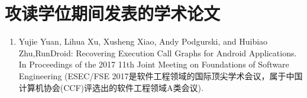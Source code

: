 \chapter*{攻读学位期间发表的学术论文}



\begin{enumerate}
	
	\item Yujie Yuan, Lihua Xu, Xusheng Xiao, Andy Podgurski, and Huibiao Zhu,RunDroid: Recovering Execution Call Graphs for Android Applications. In Proceedings of the 2017 11th Joint Meeting on Foundations of Software Engineering 
	(ESEC/FSE 2017是软件工程领域的国际顶尖学术会议，属于中国计算机协会(CCF)评选出的软件工程领域A类会议).
	
\end{enumerate}


